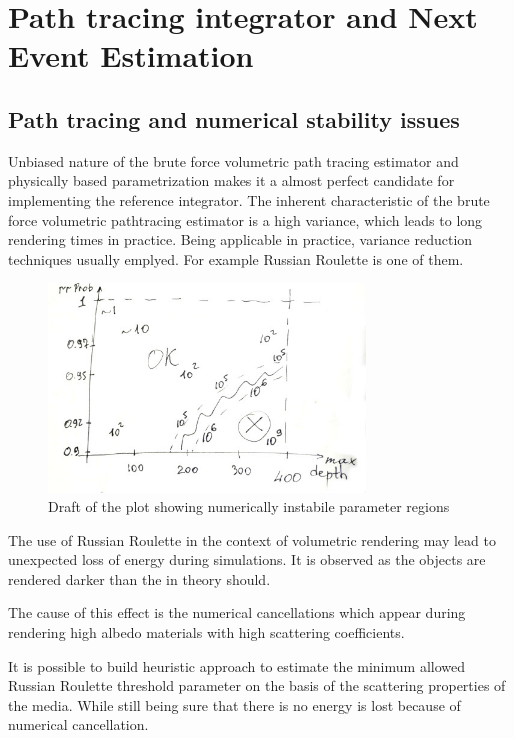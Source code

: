 \chapter{Path tracing integrator and Next Event Estimation}
\label{chapter:ptdl}


\section{Path tracing and numerical stability issues}
\label{section:numerical}

Unbiased nature of the brute force volumetric path tracing estimator and
physically based parametrization makes it a almost perfect candidate for
implementing the reference integrator.
The inherent characteristic of the brute force volumetric pathtracing estimator
is a high variance, which leads to long rendering times in practice. Being
applicable in practice, variance reduction techniques usually emplyed. For
example Russian Roulette is one of them.

\begin{figure}[h]
    \centering
    \includegraphics[width=0.75\textwidth]{imgs/plots/rr_heuristic_draft}
    \caption{Draft of the plot showing numerically instabile parameter regions}
    \label{fig:rr_regions}
\end{figure}

The use of Russian Roulette in the context of volumetric rendering may lead to
unexpected loss of energy during simulations. It is observed as the objects are
rendered darker than the in theory should.

The cause of this effect is the numerical cancellations which appear during
rendering high albedo materials with high scattering coefficients. 

It is possible to build heuristic approach to estimate the minimum allowed
Russian Roulette threshold parameter on the basis of the scattering properties
of the media. While still being sure that there is no energy is lost because of
numerical cancellation.

